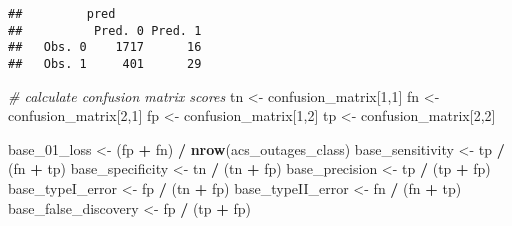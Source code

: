 \documentclass[
]{article}
\newenvironment{Shaded}{\begin{snugshade}}{\end{snugshade}}
\newcommand{\CommentTok}[1]{\textcolor[rgb]{0.56,0.35,0.01}{\textit{#1}}}
\newcommand{\DecValTok}[1]{\textcolor[rgb]{0.00,0.00,0.81}{#1}}
\newcommand{\FloatTok}[1]{\textcolor[rgb]{0.00,0.00,0.81}{#1}}
\newcommand{\KeywordTok}[1]{\textcolor[rgb]{0.13,0.29,0.53}{\textbf{#1}}}
\newcommand{\NormalTok}[1]{#1}
\newcommand{\OperatorTok}[1]{\textcolor[rgb]{0.81,0.36,0.00}{\textbf{#1}}}
\newcommand{\StringTok}[1]{\textcolor[rgb]{0.31,0.60,0.02}{#1}}
\begin{document}
\begin{Shaded}
\end{Shaded}

\begin{verbatim}
##         pred
##          Pred. 0 Pred. 1
##   Obs. 0    1717      16
##   Obs. 1     401      29
\end{verbatim}

\begin{Shaded}
\begin{Highlighting}[]
\CommentTok{# calculate confusion matrix scores}
\NormalTok{tn <-}\StringTok{ }\NormalTok{confusion_matrix[}\DecValTok{1}\NormalTok{,}\DecValTok{1}\NormalTok{]}
\NormalTok{fn <-}\StringTok{ }\NormalTok{confusion_matrix[}\DecValTok{2}\NormalTok{,}\DecValTok{1}\NormalTok{]}
\NormalTok{fp <-}\StringTok{ }\NormalTok{confusion_matrix[}\DecValTok{1}\NormalTok{,}\DecValTok{2}\NormalTok{]}
\NormalTok{tp <-}\StringTok{ }\NormalTok{confusion_matrix[}\DecValTok{2}\NormalTok{,}\DecValTok{2}\NormalTok{]}

\NormalTok{base_}\DecValTok{01}\NormalTok{_loss <-}\StringTok{ }\NormalTok{(fp }\OperatorTok{+}\StringTok{ }\NormalTok{fn) }\OperatorTok{/}\StringTok{ }\KeywordTok{nrow}\NormalTok{(acs_outages_class)}
\NormalTok{base_sensitivity <-}\StringTok{ }\NormalTok{tp }\OperatorTok{/}\StringTok{ }\NormalTok{(fn }\OperatorTok{+}\StringTok{ }\NormalTok{tp)}
\NormalTok{base_specificity <-}\StringTok{ }\NormalTok{tn }\OperatorTok{/}\StringTok{ }\NormalTok{(tn }\OperatorTok{+}\StringTok{ }\NormalTok{fp)}
\NormalTok{base_precision <-}\StringTok{ }\NormalTok{tp }\OperatorTok{/}\StringTok{ }\NormalTok{(tp }\OperatorTok{+}\StringTok{ }\NormalTok{fp)}
\NormalTok{base_typeI_error <-}\StringTok{ }\NormalTok{fp }\OperatorTok{/}\StringTok{ }\NormalTok{(tn }\OperatorTok{+}\StringTok{ }\NormalTok{fp)}
\NormalTok{base_typeII_error <-}\StringTok{ }\NormalTok{fn }\OperatorTok{/}\StringTok{ }\NormalTok{(fn }\OperatorTok{+}\StringTok{ }\NormalTok{tp)}
\NormalTok{base_false_discovery <-}\StringTok{ }\NormalTok{fp }\OperatorTok{/}\StringTok{ }\NormalTok{(tp }\OperatorTok{+}\StringTok{ }\NormalTok{fp)}
\end{Highlighting}
\end{Shaded}
\end{document}
